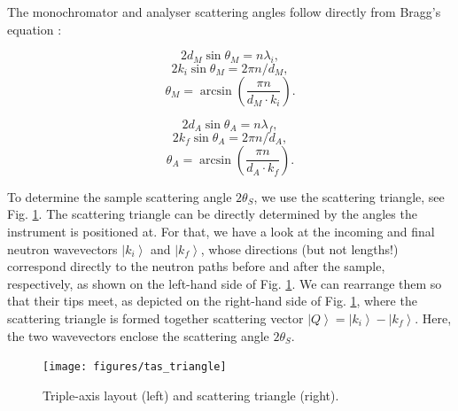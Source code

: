 The monochromator and analyser scattering angles follow directly from Bragg's equation \cite[p. 68]{Gross2012} \cite[p. 13]{Shirane2002}:

\begin{minipage}{0.45\textwidth}
	\centering
	\begin{equation} 2 d_{M}\sin \theta_{M} = n \lambda_{i}, \end{equation}
	\begin{equation} 2 k_{i} \sin \theta_{M} = 2 \pi n / d_{M}, \end{equation}
	\begin{equation} \boxed{ \theta_{M} = \arcsin \left( \frac{\pi n}{d_{M} \cdot k_{i}} \right). } \end{equation}
\end{minipage}
\begin{minipage}{0.45\textwidth}
	\centering
	\begin{equation} 2 d_{A}\sin \theta_{A} = n \lambda_{f}, \end{equation}
	\begin{equation} 2 k_{f} \sin \theta_{A} = 2 \pi n / d_{A}, \end{equation}
	\begin{equation} \boxed{ \theta_{A} = \arcsin \left( \frac{\pi n}{d_{A} \cdot k_{f}} \right). } \end{equation}
\end{minipage}

\vspace{0.5cm}

To determine the sample scattering angle $2 \theta_S$, we use the scattering triangle, see Fig. \ref{fig:scattering_triangle}. 
The scattering triangle can be directly determined by the angles the instrument is positioned at. 
For that, we have a look at the incoming and final neutron wavevectors $\left| k_i \right>$ and $\left| k_f \right>$, whose directions (but not lengths!) correspond directly to the neutron paths before and after the sample, respectively, as shown on the left-hand side of Fig. \ref{fig:scattering_triangle}. We can rearrange them so that their tips meet, as depicted on the right-hand side of Fig. \ref{fig:scattering_triangle}, where the scattering triangle is formed together scattering vector $\left| Q \right> = \left| k_i \right> - \left| k_f \right>$. Here, the two wavevectors enclose the scattering angle $2 \theta_S$.

\begin{figure}
	\begin{center}
		\texttt{[image: figures/tas\_triangle]}
	\end{center}
	\caption{Triple-axis layout (left) and scattering triangle (right). \label{fig:scattering_triangle}}
\end{figure}

